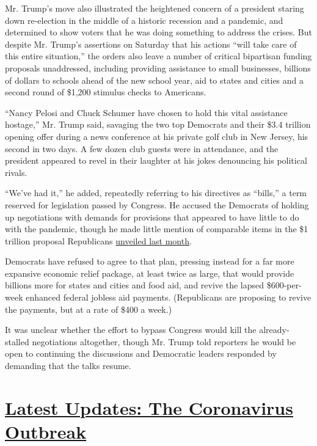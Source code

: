 Mr. Trump's move also illustrated the heightened concern of a president
staring down re-election in the middle of a historic recession and a
pandemic, and determined to show voters that he was doing something to
address the crises. But despite Mr. Trump's assertions on Saturday that
his actions ``will take care of this entire situation,'' the orders also
leave a number of critical bipartisan funding proposals unaddressed,
including providing assistance to small businesses, billions of dollars
to schools ahead of the new school year, aid to states and cities and a
second round of \$1,200 stimulus checks to Americans.

``Nancy Pelosi and Chuck Schumer have chosen to hold this vital
assistance hostage,'' Mr. Trump said, savaging the two top Democrats and
their \$3.4 trillion opening offer during a news conference at his
private golf club in New Jersey, his second in two days. A few dozen
club guests were in attendance, and the president appeared to revel in
their laughter at his jokes denouncing his political rivals.

``We've had it,'' he added, repeatedly referring to his directives as
``bills,'' a term reserved for legislation passed by Congress. He
accused the Democrats of holding up negotiations with demands for
provisions that appeared to have little to do with the pandemic, though
he made little mention of comparable items in the \$1 trillion proposal
Republicans
\href{https://www.nytimes3xbfgragh.onion/2020/07/27/us/politics/republicans-jobless-aid.html}{unveiled
last month}.

Democrats have refused to agree to that plan, pressing instead for a far
more expansive economic relief package, at least twice as large, that
would provide billions more for states and cities and food aid, and
revive the lapsed \$600-per-week enhanced federal jobless aid payments.
(Republicans are proposing to revive the payments, but at a rate of
\$400 a week.)

It was unclear whether the effort to bypass Congress would kill the
already-stalled negotiations altogether, though Mr. Trump told reporters
he would be open to continuing the discussions and Democratic leaders
responded by demanding that the talks resume.

\hypertarget{latest-updates-the-coronavirus-outbreak}{%
\section{\texorpdfstring{\href{https://www.nytimes3xbfgragh.onion/2020/08/20/world/coronavirus-covid.html?action=click\&pgtype=Article\&state=default\&region=MAIN_CONTENT_1\&context=storylines_live_updates}{Latest
Updates: The Coronavirus
Outbreak}}{Latest Updates: The Coronavirus Outbreak}}\label{latest-updates-the-coronavirus-outbreak}}

